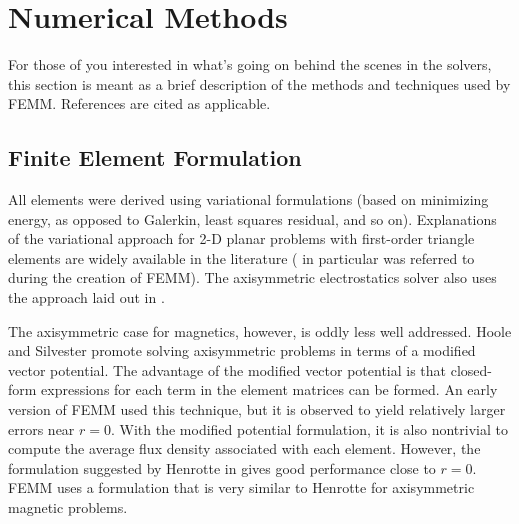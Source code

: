 \documentclass[12pt]{report}
\begin{document}
%
%















\chapter{Numerical Methods}  \label{fkern_stuff}

For those of you interested in what's going on behind the scenes in
the solvers, this section is meant as a brief description of the
methods and techniques used by FEMM. References are cited as
applicable.

\section{Finite Element Formulation}

All elements were derived using variational formulations (based on
minimizing energy, as opposed to Galerkin, least squares residual,
and so on).  Explanations of the variational approach for 2-D
planar problems with first-order triangle elements are widely
available in the literature (\cite{allaire} in particular was
referred to during the creation of FEMM).  The axisymmetric
electrostatics solver also uses the approach laid out in
\cite{allaire}.

The axisymmetric case for magnetics, however, is oddly less well
addressed. Hoole \cite{Hoole} and Silvester \cite{silv} promote
solving axisymmetric problems in terms of a modified vector
potential. The advantage of the modified vector potential is that
closed-form expressions for each term in the element matrices can
be formed. An early version of FEMM used this technique, but it is
observed to yield relatively larger errors near $r=0$. With the
modified potential formulation, it is also nontrivial to compute
the average flux density associated with each element. However, the
formulation suggested by Henrotte in \cite{Henrotte} gives good
performance close to $r=0$. FEMM uses a formulation that is very
similar to Henrotte for axisymmetric magnetic problems.
\end{document}
